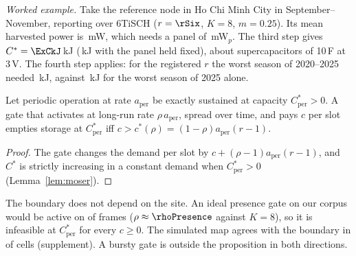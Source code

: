 \noindent\emph{Worked example.} Take the reference node in Ho Chi Minh City in September--November, reporting over 6TiSCH ($r=\rSix$, $K=8$, $m=0.25$). Its mean harvested power is \ExPmean\,mW, which needs a panel of \ExWp\,mW$_p$. The third step gives $C^*=\ExCkJ$\,kJ (\ExCkJFixed\,kJ with the panel held fixed), about \ExCaps{} supercapacitors of 10\,F at 3\,V. The fourth step applies: for the registered $r$ the worst season of 2020--2025 needed \AivbWorstkJ\,kJ, against \AivbFivekJ\,kJ for the worst season of 2025 alone.

\begin{proposition}\label{prop:gate}
Let periodic operation at rate $a_{\mathrm{per}}$ be exactly sustained at capacity $C^*_{\mathrm{per}}>0$. A gate that activates at long-run rate $\rho\,a_{\mathrm{per}}$, spread over time, and pays $c$ per slot empties storage at $C^*_{\mathrm{per}}$ iff $c>c^*(\rho)=(1-\rho)a_{\mathrm{per}}(r-1)$.
\end{proposition}
\begin{proof}
The gate changes the demand per slot by $c+(\rho-1)a_{\mathrm{per}}(r-1)$, and $C^*$ is strictly increasing in a constant demand when $C^*_{\mathrm{per}}>0$ (Lemma~\ref{lem:moser}).
\end{proof}
\noindent The boundary does not depend on the site. An ideal presence gate on our corpus would be active on \inEventFrac{} of frames ($\rho\approx\rhoPresence$ against $K=8$), so it is infeasible at $C^*_{\mathrm{per}}$ for every $c\ge0$. The simulated map agrees with the boundary in \nGateAgree{} of \nGate{} cells (supplement). A bursty gate is outside the proposition in both directions.

